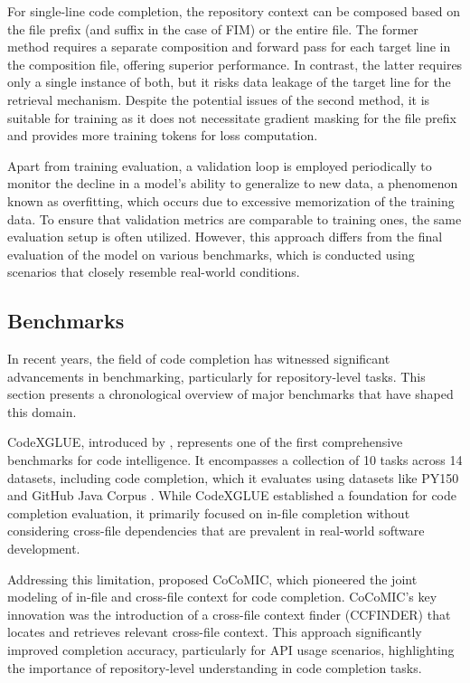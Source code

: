 For single-line code completion, the repository context can be composed based on the file prefix (and suffix in the case of FIM) or the entire file. The former method requires a separate composition and forward pass for each target line in the composition file, offering superior performance. In contrast, the latter requires only a single instance of both, but it risks data leakage of the target line for the retrieval mechanism. Despite the potential issues of the second method, it is suitable for training as it does not necessitate gradient masking for the file prefix and provides more training tokens for loss computation.

Apart from training evaluation, a validation loop is employed periodically to monitor the decline in a model's ability to generalize to new data, a phenomenon known as overfitting, which occurs due to excessive memorization of the training data. To ensure that validation metrics are comparable to training ones, the same evaluation setup is often utilized. However, this approach differs from the final evaluation of the model on various benchmarks, which is conducted using scenarios that closely resemble real-world conditions.

\subsection{Benchmarks}

In recent years, the field of code completion has witnessed significant advancements in benchmarking, particularly for repository-level tasks. This section presents a chronological overview of major benchmarks that have shaped this domain.

CodeXGLUE, introduced by \citet{lu2021}, represents one of the first comprehensive benchmarks for code intelligence. It encompasses a collection of 10 tasks across 14 datasets, including code completion, which it evaluates using datasets like PY150 \parencite{raychev2016} and GitHub Java Corpus \parencite{allamanis2013}. While CodeXGLUE established a foundation for code completion evaluation, it primarily focused on in-file completion without considering cross-file dependencies that are prevalent in real-world software development.

Addressing this limitation, \citet{ding2022} proposed CoCoMIC, which pioneered the joint modeling of in-file and cross-file context for code completion. CoCoMIC's key innovation was the introduction of a cross-file context finder (CCFINDER) that locates and retrieves relevant cross-file context. This approach significantly improved completion accuracy, particularly for API usage scenarios, highlighting the importance of repository-level understanding in code completion tasks.

